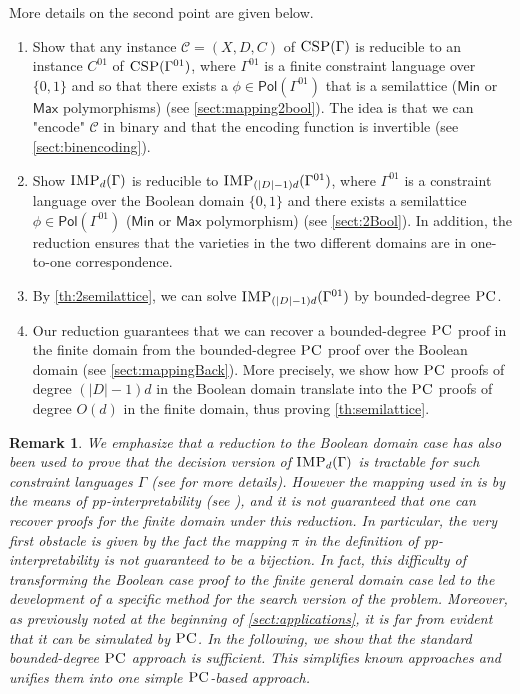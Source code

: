 \documentclass[11pt]{article}
\newcommand{\Cc}{\mathcal{C}}
\newcommand{\CSP}{\textsc{CSP}}
\newcommand{\IMP}{\textsc{IMP}}
\newcommand{\Pol}{\textsf{Pol}}
\newcommand{\PC}{\textsc{PC}}
\newcommand{\Max}{\textsf{Max}}
\newcommand{\Min}{\textsf{Min}}
\newcommand{\1}{\textbf{1}}
\newcommand\uval{{(|D|-1)}}
\newtheorem{remark}[theorem]{Remark}
\begin{document}
More details on the second point are given below.

\begin{enumerate}
    \item Show that any instance $\Cc = (X,D,C)$ of $\CSP(\Gamma)$ is reducible to an instance $C^{01}$ of $\CSP(\Gamma^{01})$, where $\Gamma^{01}$ is a finite constraint language over $\{0,1\}$ and so that there exists a $\phi \in \Pol(\Gamma^{01})$ that is a semilattice ($\Min$ or $\Max$ polymorphisms) (see \cref{sect:mapping2bool}). The idea is that we can "encode" $\Cc$ in binary and that the encoding function is invertible (see \cref{sect:binencoding}).
    \item Show $\IMP_d(\Gamma)$ is reducible to $\IMP_{\uval d}(\Gamma^{01})$, where $\Gamma^{01}$ is a constraint language over the Boolean domain $\{0,1\}$ and there exists a semilattice $\phi \in \Pol(\Gamma^{01})$ ($\Min$ or $\Max$ polymorphism) (see \cref{sect:2Bool}). In addition, the reduction ensures that the varieties in the two different domains are in one-to-one correspondence.
    \item By \cref{th:2semilattice}, we can solve $\IMP_{\uval d}(\Gamma^{01})$ by bounded-degree $\PC$.
    \item Our reduction guarantees that we can recover a bounded-degree $\PC$ proof in the finite domain from the bounded-degree $\PC$ proof over the Boolean domain (see \cref{sect:mappingBack}). More precisely, we show how $\PC$ proofs of degree $\uval d$ in the Boolean domain translate into the $\PC$ proofs of degree $O(d)$ in the finite domain, thus proving \cref{th:semilattice}.
\end{enumerate}

\begin{remark}\label{rm:semilattice}
We emphasize that a reduction to the Boolean domain case has also been used to prove that the decision version of $\IMP_d(\Gamma)$ is tractable for such constraint languages $\Gamma$ (see \cite[Th. 5.10]{BulatovRSTOC22} for more details). However the mapping used in \cite{BulatovRSTOC22} is by the means of pp-interpretability (see \cite{DonaPapert1964}), and it is not guaranteed that one can recover proofs for the finite domain under this reduction. In particular, the very first obstacle is given by the fact the mapping $\pi$ in the definition of pp-interpretability \cite[Def.~3.12]{BulatovRSTOC22} is not guaranteed to be a bijection. In fact, this difficulty of transforming the Boolean case proof to the finite general domain case led to the development of a specific method \cite[Th.~6.5]{BulatovRSTOC22} for the search version of the problem. Moreover, as previously noted at the beginning of \cref{sect:applications}, it is far from evident that it can be simulated by $\PC$. In the following, we show that the standard bounded-degree $\PC$ approach is sufficient. This simplifies known approaches and unifies them into one simple $\PC$-based approach.
\end{remark}
\end{document}
